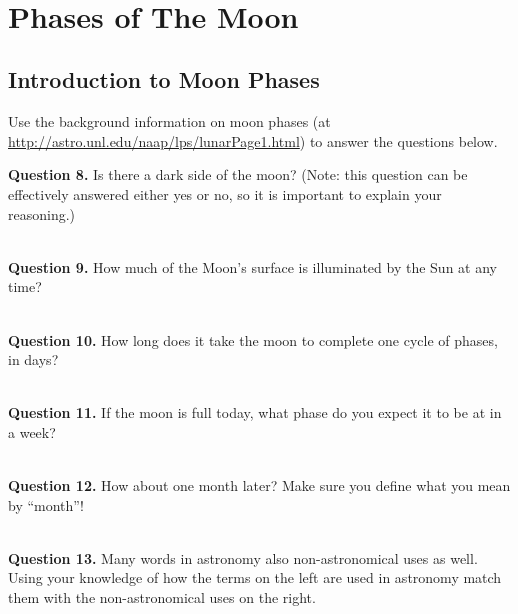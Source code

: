 \documentclass[11pt]{article}
\begin{document}
\vspace*{2cm}

\hrulefill\\

\newpage

\section{Phases of The Moon}

\subsection{Introduction to Moon Phases}

Use the background information on moon phases (at \url{http://astro.unl.edu/naap/lps/lunarPage1.html}) 
to answer the questions below.

\noindent
\textbf{Question 8.}
Is there a dark side of the moon?  (Note: this question can be effectively answered either yes or no, so it is important to explain your reasoning.) 
\vspace*{2cm}

\hrulefill\\

\noindent
\textbf{Question 9.}
How much of the Moon's surface is illuminated by the Sun at any time?
\vspace*{1cm}

\hrulefill\\

\noindent
\textbf{Question 10.}
How long does it take the moon to complete one cycle of phases, in days?
\vspace*{1cm}

\hrulefill\\

\noindent
\textbf{Question 11.}
If the moon is full today, what phase do you expect it to be at in a week? 
\vspace*{1cm}

\hrulefill\\

\noindent
\textbf{Question 12.}
How about one month later? Make sure you define what you mean by ``month''!
\vspace*{1cm}

\hrulefill\\

\noindent
\textbf{Question 13.}
Many words in astronomy also non-astronomical uses as well. Using your knowledge of how the terms on the left are used in astronomy match them with the non-astronomical uses on the right.
\vspace*{0.5cm}
\end{document}

